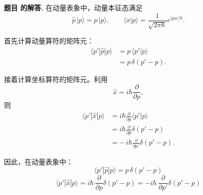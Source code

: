 \documentclass[12pt, a4paper, oneside]{ctexart}
\newcounter{problemname}
\newenvironment{solution}
  {\par\noindent\textbf{题目 \theproblemname 的解答. }}
  {\par}
\begin{document}
\begin{solution}
  在动量表象中，动量本征态满足
\[
\hat{p}\,|p\rangle = p\,|p\rangle , \qquad 
\langle x | p \rangle = \frac{1}{\sqrt{2\pi\hbar}} e^{ipx/\hbar}.
\]

\noindent
首先计算动量算符的矩阵元：
\begin{align*}
\langle p' | \hat{p} | p \rangle
&= p \, \langle p' | p \rangle   \\
&= p \, \delta(p'-p).
\end{align*}

\noindent
接着计算坐标算符的矩阵元。利用
\[
\hat{x} = i\hbar \frac{\partial}{\partial p},
\]
则
\begin{align*}
\langle p' | \hat{x} | p \rangle
&= i\hbar \frac{\partial}{\partial p} \langle p' | p \rangle \\
&= i\hbar \frac{\partial}{\partial p} \delta(p'-p) \\
&= -\,i\hbar \frac{\partial}{\partial p'} \delta(p'-p).
\end{align*}

\noindent
因此，在动量表象中：
\[
\boxed{
\langle p' | \hat{p} | p \rangle = p\,\delta(p'-p)
}
\]
\[
\boxed{
\langle p' | \hat{x} | p \rangle = i\hbar\,\frac{\partial}{\partial p}\delta(p'-p)
     = -i\hbar\,\frac{\partial}{\partial p'}\delta(p'-p)
}
\]
\end{solution}
\end{document}
